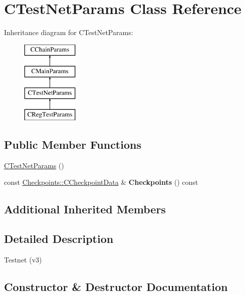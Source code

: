 \hypertarget{class_c_test_net_params}{}\section{C\+Test\+Net\+Params Class Reference}
\label{class_c_test_net_params}
Inheritance diagram for C\+Test\+Net\+Params\+:\begin{figure}[H]
\begin{center}
\leavevmode
\includegraphics[height=4.000000cm]{class_c_test_net_params}
\end{center}
\end{figure}
\subsection*{Public Member Functions}
\begin{DoxyCompactItemize}
\item 
\mbox{\hyperlink{class_c_test_net_params_abbd5f6e3e94bc8abf99a5dfaff75374a}{C\+Test\+Net\+Params}} ()
\item 
\mbox{\label{class_c_test_net_params_af19780caeb765b7d8b51cd1c0a109fa1}} 
const \mbox{\hyperlink{struct_checkpoints_1_1_c_checkpoint_data}{Checkpoints\+::\+C\+Checkpoint\+Data}} \& {\bfseries Checkpoints} () const
\end{DoxyCompactItemize}
\subsection*{Additional Inherited Members}


\subsection{Detailed Description}
Testnet (v3) 

\subsection{Constructor \& Destructor Documentation}
\mbox{\label{class_c_test_net_params_abbd5f6e3e94bc8abf99a5dfaff75374a}} 
